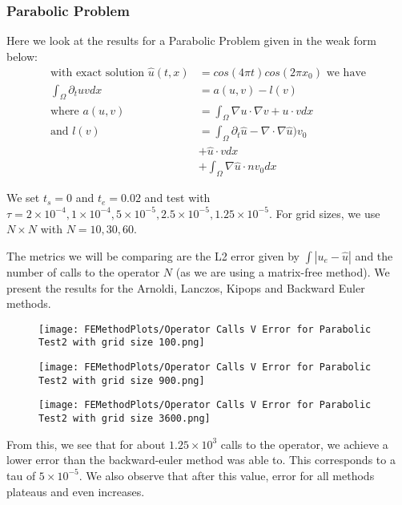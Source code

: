 \documentclass{article}
\begin{document}
\subsubsection{Parabolic Problem}
Here we look at the results for a Parabolic Problem given in the weak form below:
\begin{align*}
\text{with exact solution }\hat u(t,x) &= cos(4\pi t)cos(2\pi x_0) \text{ we have}\\
\int_{\Omega} \partial_tu v dx&= a(u,v) - l(v)\\
\text{where }a(u,v) &= \int_{\Omega} \nabla u \cdot \nabla v + u \cdot v dx\\
\text{and }l(v) &= \int_{\Omega}\partial_t\hat u - \nabla \cdot \nabla \hat u)  v_0\\
&+\hat u \cdot vdx\\
&+\int_{\Omega} \nabla \hat u \cdot n v_0 dx
\end{align*}

We set $t_s = 0$ and $t_e = 0.02$ and test with $\tau = 2\times 10^{-4}, 1\times 10^{-4}, 5\times 10^{-5}, 2.5\times 10^{-5}, 1.25\times 10^{-5}$.
For grid sizes, we use $N\times N$ with $N = 10,30,60$.

The metrics we will be comparing are the L2 error given by $\int |u_e - \hat u|$ and the number of calls to the operator $N$ (as we are using a matrix-free method).
We present the results for the Arnoldi, Lanczos, Kipops\cite{Gaudreault2018} and Backward Euler methods.

\begin{figure}[H]
	  \texttt{[image: FEMethodPlots/Operator Calls V Error for Parabolic Test2 with grid size 100.png]}
\end{figure}
\begin{figure}[H]
	  \texttt{[image: FEMethodPlots/Operator Calls V Error for Parabolic Test2 with grid size 900.png]}
\end{figure}
\begin{figure}[H]
	  \texttt{[image: FEMethodPlots/Operator Calls V Error for Parabolic Test2 with grid size 3600.png]}
\end{figure}

From this, we see that for about $1.25\times 10^{3}$ calls to the operator, we achieve a lower error than the backward-euler method was able to.
This corresponds to a tau of $ 5\times 10^{-5}$.
We also observe that after this value, error for all methods plateaus and even increases.
\end{document}
